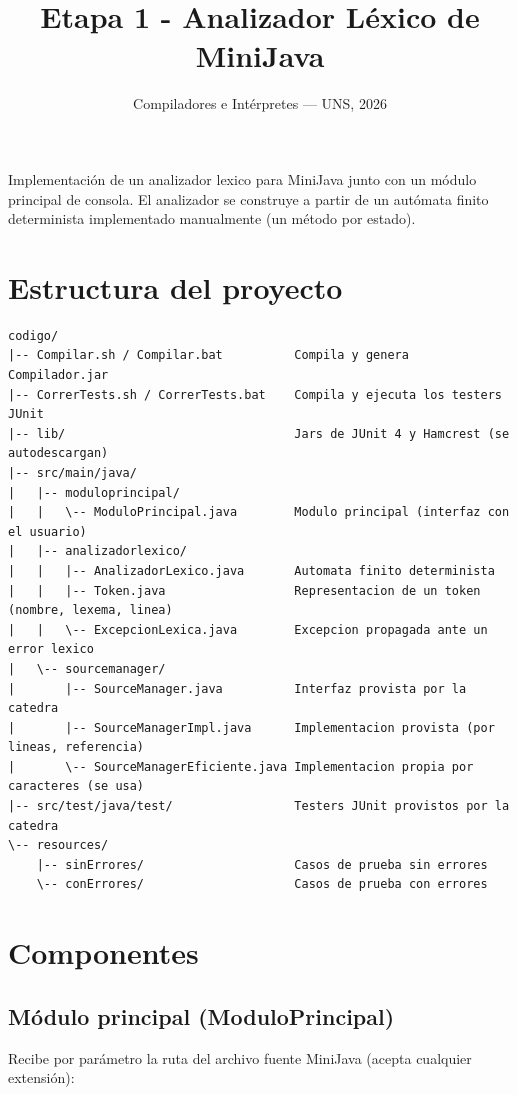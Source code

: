 \documentclass[11pt,a4paper]{article}
\title{Etapa 1 - Analizador Léxico de MiniJava}
\author{Compiladores e Intérpretes --- UNS, 2026}
\date{}
\begin{document}
\sloppy

\maketitle

\noindent
Implementación de un analizador lexico para MiniJava junto con un módulo principal de
consola. El analizador se construye a partir de un autómata finito determinista
implementado manualmente (un método por estado).

\section{Estructura del proyecto}

{\footnotesize
\begin{verbatim}
codigo/
|-- Compilar.sh / Compilar.bat          Compila y genera Compilador.jar
|-- CorrerTests.sh / CorrerTests.bat    Compila y ejecuta los testers JUnit
|-- lib/                                Jars de JUnit 4 y Hamcrest (se autodescargan)
|-- src/main/java/
|   |-- moduloprincipal/
|   |   \-- ModuloPrincipal.java        Modulo principal (interfaz con el usuario)
|   |-- analizadorlexico/
|   |   |-- AnalizadorLexico.java       Automata finito determinista
|   |   |-- Token.java                  Representacion de un token (nombre, lexema, linea)
|   |   \-- ExcepcionLexica.java        Excepcion propagada ante un error lexico
|   \-- sourcemanager/
|       |-- SourceManager.java          Interfaz provista por la catedra
|       |-- SourceManagerImpl.java      Implementacion provista (por lineas, referencia)
|       \-- SourceManagerEficiente.java Implementacion propia por caracteres (se usa)
|-- src/test/java/test/                 Testers JUnit provistos por la catedra
\-- resources/
    |-- sinErrores/                     Casos de prueba sin errores
    \-- conErrores/                     Casos de prueba con errores
\end{verbatim}
}

\section{Componentes}

\subsection{Módulo principal (ModuloPrincipal)}

Recibe por parámetro la ruta del archivo fuente MiniJava (acepta cualquier extensión):
\end{document}
